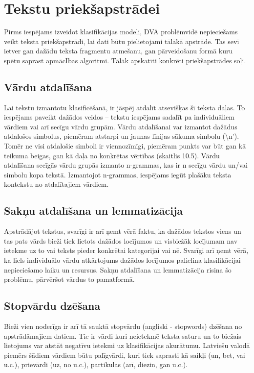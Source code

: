 \section{Tekstu priekšapstrādei}
Pirms iespējams izveidot klasifikācijas modeli, DVA problēmvidē nepieciešams veikt teksta priekšapstrādi, lai dati būtu pielietojami tālākā apstrādē. Tas sevī ietver gan dažādu teksta fragmentu atmešanu, gan pārveidošanu formā kuru spētu saprast apmācIbas algoritmi. Tālāk apskatīti konkrēti priekšapstrādes soļi.

\subsection{Vārdu atdalīšana}
Lai tekstu izmantotu klasificēšanā, ir jāspēj atdalīt atsevišķas šī teksta daļas. To iespējams paveikt dažādos veidos – tekstu iespējams sadalīt pa individuāliem vārdiem vai arī  secīgu vārdu grupām. Vārdu atdalīšanai var izmantot dažādus atdalošos simbolus, piemēram atstarpi un jaunas līnijas sākuma simbolu (\textbackslash n’). Tomēr ne visi atdalošie simboli ir viennozīmīgi, piemēram punkts var būt gan kā teikuma beigas, gan kā daļa no konkrētas vērtības (skaitlis 10.5).
Vārdu atdalīšana secīgās vārdu grupās izmanto n-grammas, kas ir n secīgu vārdu un/vai simbolu kopa tekstā. Izmantojot n-grammas, iespējams iegūt plašāku teksta kontekstu no atdalītajiem vārdiem.

\subsection{Sakņu atdalīšana un lemmatizācija}
Apstrādājot tekstus, svarīgi ir arī ņemt vērā faktu, ka dažādos tekstos viens un tas pats vārds bieži tiek lietots dažādos locījumos un visbiežāk locījumam nav ietekme uz to vai teksts pieder konkrētai kategorijai vai nē. Svarīgi arī ņemt vērā, ka liels individuālo vārdu atkārtojums dažādos locījumos palielina klasifikācijai nepieciešamo laiku un resursus. Sakņu atdalīšana un lemmatizācija risina šo problēmu, pārvēršot vārdus to pamatformā. 

\subsection{Stopvārdu dzēšana}
Bieži vien noderīga ir arī tā sauktā stopvārdu (angliski - stopwords) dzēšana no apstrādāmajiem datiem. Tie ir vārdi kuri neietekmē teksta saturu un to biežais lietojums var atstāt negatīvu ietekmi uz klasifikācijas akurātumu. Latviešu valodā piemērs šādiem vārdiem būtu palīgvārdi, kuri tiek saprasti kā saikļi (un, bet, vai u.c.), prievārdi (uz, no u.c.), partikulas (arī, diezin, gan u.c.).

